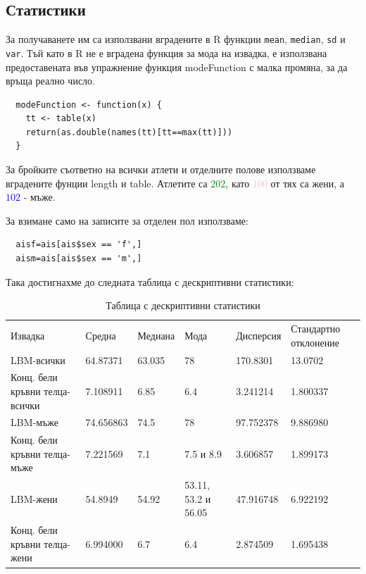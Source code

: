 \documentclass[12pt]{article} %
\newcommand{\code}{\texttt}
\begin{document}
\begin{large}
  \section{Статистики}
  За получаванете им са използвани вградените в R функции \code{mean}, \code{median}, \code{sd} и \code{var}. Тъй като в R не е вградена функция за мода на извадка, е използвана предоставената във упражнение функция modeFunction с малка промяна, за да връща реално число.

\begin{verbatim}
  modeFunction <- function(x) {
    tt <- table(x)
    return(as.double(names(tt)[tt==max(tt)]))
  }
\end{verbatim}

  За бройките съответно на всички атлети и отделните полове използваме вградените фунции length и table. Атлетите са \textcolor{green}{$202$}, като \textcolor{pink}{$100$} от тях са жени, а \textcolor{blue}{$102$} - мъже.

  За взимане само на записите за отделен пол използваме:
\begin{verbatim}
  aisf=ais[ais$sex == 'f',]
  aism=ais[ais$sex == 'm',]
\end{verbatim}
  Така достигнахме до следната таблица с дескриптивни статистики:
  \clearpage

  \begin{table}
    \centering
    \begin{tabular}{|L{3cm}|L{2.4cm}|L{2.4cm}|L{2.4cm}|L{2.4cm}|L{2.4cm}|}
      \hline
      Извадка & Средна & Медиана & Мода  & Дисперсия & Стандартно отклонение\\
      LBM-всички & 64.87371 & 63.035 & 78 & 170.8301 & 13.0702 \\
      \hline
      Конц. бели кръвни телца-всички & 7.108911 & 6.85 & 6.4 & 3.241214 & 1.800337 \\
      \hline
      LBM-мъже & 74.656863 & 74.5 & 78 & 97.752378 & 9.886980 \\
      \hline
      Конц. бели кръвни телца-мъже & 7.221569 & 7.1 & 7.5 и 8.9 & 3.606857 & 1.899173 \\
      \hline
      LBM-жени & 54.8949 & 54.92 & 53.11, 53.2 и 56.05 & 47.916748 & 6.922192 \\
      \hline
      Конц. бели кръвни телца-жени & 6.994000 & 6.7 & 6.4 & 2.874509 & 1.695438 \\
      \hline
    \end{tabular}
    \caption{Таблица с дескриптивни статистики}
  \end{table}


\end{large}
\end{document}

